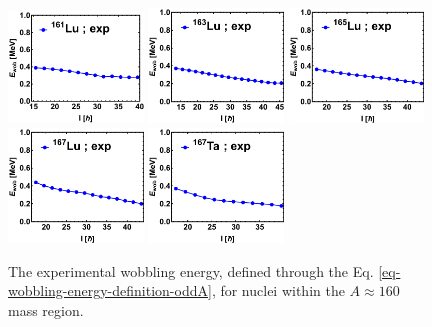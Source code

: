 \begin{figure}
    \centering
    \includegraphics[width=0.32\textwidth]{Chapters/Figures/wobblers/161Lu.pdf}
    \includegraphics[width=0.32\textwidth]{Chapters/Figures/wobblers/163Lu.pdf}
    \includegraphics[width=0.32\textwidth]{Chapters/Figures/wobblers/165Lu.pdf}
    \includegraphics[width=0.32\textwidth]{Chapters/Figures/wobblers/167Lu.pdf}
    \includegraphics[width=0.32\textwidth]{Chapters/Figures/wobblers/167Ta.pdf}
    \caption{The experimental wobbling energy, defined through the Eq. \ref{eq-wobbling-energy-definition-oddA}, for nuclei within the $A\approx 160$ mass region.}
    \label{wobblers-exp-set3}
\end{figure}

